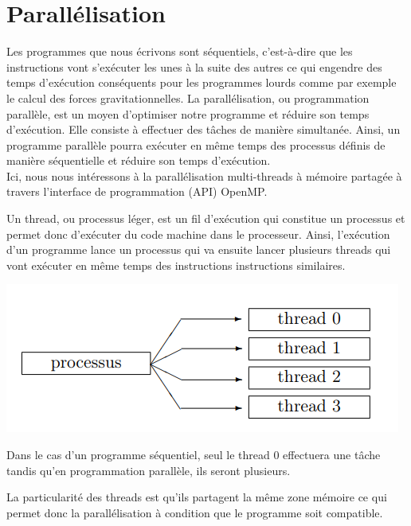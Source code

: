 \chapter{Parallélisation }
Les programmes que nous écrivons sont séquentiels, c'est-à-dire que les instructions vont s'exécuter les unes à la suite des autres ce qui engendre des temps d'exécution conséquents pour les programmes lourds comme par exemple le calcul des forces gravitationnelles.
La parallélisation, ou programmation parallèle, est un moyen d'optimiser notre programme et réduire son temps d'exécution. 
Elle consiste à effectuer des tâches de manière simultanée. Ainsi, un programme parallèle pourra exécuter en même temps des processus définis de manière séquentielle et réduire son temps d'exécution.\\

Ici, nous nous intéressons à la parallélisation multi-threads à mémoire partagée à travers l'interface de programmation (API) OpenMP.

\vspace{2mm}
Un thread, ou processus léger, est un fil d'exécution qui constitue un processus et permet donc d'exécuter du code machine dans le processeur. Ainsi, l'exécution d'un programme lance un processus qui va ensuite lancer plusieurs threads qui vont exécuter en même temps des instructions instructions similaires.


\begin{center}
\includegraphics[scale=0.8]{images/process_thread.png}
\captionsetup{hypcap=false}
\label{fig10}

\end{center} 

Dans le cas d'un programme séquentiel, seul le thread 0 effectuera une tâche tandis qu'en programmation parallèle, ils seront plusieurs.

\vspace{2mm}
La particularité des threads est qu'ils partagent la même zone mémoire ce qui permet donc la parallélisation à condition que le programme soit compatible.

